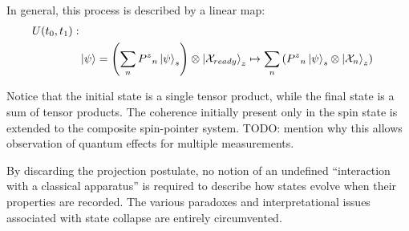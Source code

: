 In general, this process is described by a linear map:
\begin{align}
    \nonumber U(t_0, t_1): \\
    & \ket{\psi} = \left(\sum_{n} {P^z}_n\ket{\psi}_s\right) \otimes \ket{\mathcal{X}_{ready}}_z \mapsto \sum_{n}\left({P^z}_n\ket{\psi}_s \otimes \ket{\mathcal{X}_n}_z\right)
\end{align}

Notice that the initial state is a single tensor product, while the final state is a sum of tensor products. The coherence initially present only in the spin state is extended to the composite spin-pointer system. TODO: mention why this allows observation of quantum effects for multiple measurements.

By discarding the projection postulate, no notion of an undefined ``interaction with a classical apparatus'' is required to describe how states evolve when their properties are recorded. The various paradoxes and interpretational issues associated with state collapse are entirely circumvented.
